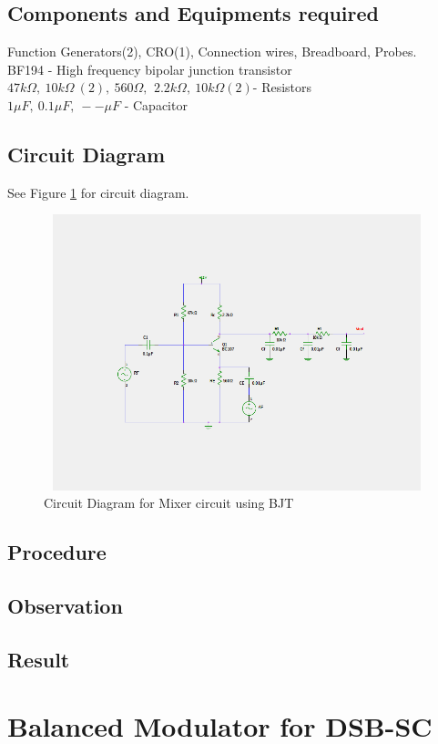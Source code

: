 \documentclass{book}
\begin{document}
\section*{Components and Equipments required}
Function Generators(2), CRO(1), Connection wires, Breadboard, Probes.
\\BF194 - High frequency bipolar junction transistor
\\ $47k\Omega,\  10k\Omega\ (2),\ 560\Omega,\,\ 2.2k\Omega ,\ 10k\Omega (2) $- Resistors
\\ $ 1\mu F,\ 0.1\mu F, \ --\mu F $ - Capacitor
\section*{Circuit Diagram}
See Figure \ref{mixer} for circuit diagram.
\begin{figure}[h]
\includegraphics[width=12cm, height=8cm, trim=4cm 3.5cm 3cm 3.5cm,clip=true]{mixer.png}
\caption{Circuit Diagram for Mixer circuit using BJT}
\label{mixer}
\end{figure}
\section*{Procedure}
\section*{Observation}
\section*{Result}


\chapter[Balanced Modulator for DSB-SC]{Balanced Modulator for DSB-SC}
\end{document}
